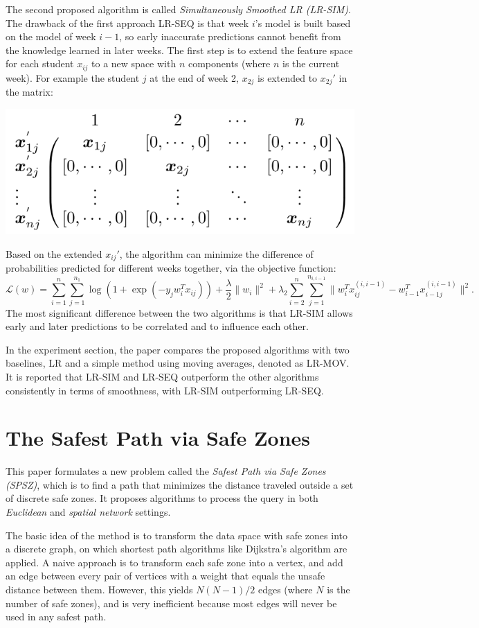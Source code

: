 \documentclass[paper=a4, fontsize=18pt]{article} %
\numberwithin{equation}{section} %
\numberwithin{figure}{section} %
\numberwithin{table}{section} %
\newcommand{\mL}{\mathcal{L}}
\begin{document}
The second proposed algorithm is called \emph{Simultaneously Smoothed LR (LR-SIM)}. The drawback of the first approach LR-SEQ is that week $i$'s model is built based on the model of week $i-1$, so early inaccurate predictions cannot benefit from the knowledge learned in later weeks. The first step is to extend the feature space for each student $x_{ij}$ to a new space with $n$ components (where $n$ is the current week). For example the student $j$ at the end of week 2, $x_{2j}$ is extended to $x_{2j}'$ in the matrix:
\begin{center}
\includegraphics[width=.6\linewidth]{8_15_MOOC.png}
\end{center}
Based on the extended $x_{ij}'$, the algorithm can minimize the difference of probabilities predicted for different weeks together, via the objective function:
$$\mL(w) = \sum_{i=1}^n \sum_{j=1}^{n_1} \log(1+\exp(-y_j w_i^T x_{ij})) + \frac{\lambda}{2} \|w_i\|^2 + \lambda_2 \sum_{i=2}^n \sum_{j=1}^{n_{i,i-1}} \|w_i^T x_{ij}^{(i,i-1)} - w_{i-1}^T x_{i-1j}^{(i,i-1)}\|^2.$$
The most significant difference between the two algorithms is that LR-SIM allows early and later predictions to be correlated and to influence each other.

In the experiment section, the paper compares the proposed algorithms with two baselines, LR and a simple method using moving averages, denoted as LR-MOV. It is reported that LR-SIM and LR-SEQ outperform the other algorithms consistently in terms of smoothness, with LR-SIM outperforming LR-SEQ.

\section{The Safest Path via Safe Zones \cite{AQJZHW15}}

This paper formulates a new problem called the \emph{Safest Path via Safe Zones (SPSZ)}, which is to find a path that minimizes the distance traveled outside a set of discrete safe zones. It proposes algorithms to process the query in both \emph{Euclidean} and \emph{spatial network} settings.

The basic idea of the method is to transform the data space with safe zones into a discrete graph, on which shortest path algorithms like Dijkstra's algorithm are applied. A naive approach is to transform each safe zone into a vertex, and add an edge between every pair of vertices with a weight that equals the unsafe distance between them. However, this yields $N(N-1)/2$ edges (where $N$ is the number of safe zones), and is very inefficient because most edges will never be used in any safest path.
\end{document}
